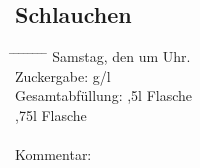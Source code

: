 \documentclass[12pt,oneside,a4paper]{scrartcl}
\begin{document}
{\subsection*{Schlauchen}
	\begin{tabbing}
		\hspace{1cm} \= \hspace{1cm} \= \hspace{1cm} \= \hspace{1cm} \= \hspace{1cm} \= \hspace{1cm} \= \hspace{1cm} \= \hspace{1cm} \= \kill
		\> Samstag, den  um  Uhr.\\
		\> Zuckergabe:  g/l\\
		\> Gesamtabfüllung: \> \> \> \>  ,5l Flasche\\
		\> \> \> \> \>  ,75l Flasche\\
		\\
		\> Kommentar: \>\>\>\\
	\end{tabbing}
%
}
\end{document}
